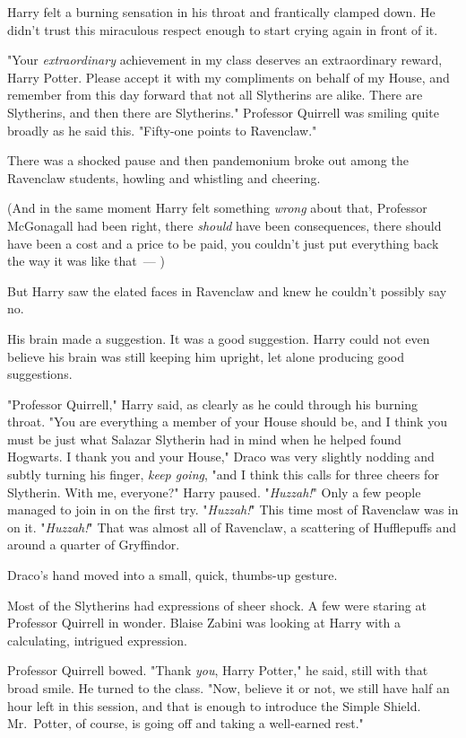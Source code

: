 Harry felt a burning sensation in his throat and frantically clamped down. He
didn't trust this miraculous respect enough to start crying again in front of
it.

"Your \emph{extraordinary} achievement in my class deserves an extraordinary
reward, Harry Potter. Please accept it with my compliments on behalf of my
House, and remember from this day forward that not all Slytherins are alike.
There are Slytherins, and then there are Slytherins." Professor Quirrell was
smiling quite broadly as he said this. "Fifty-one points to Ravenclaw."

There was a shocked pause and then pandemonium broke out among the Ravenclaw
students, howling and whistling and cheering.

(And in the same moment Harry felt something \emph{wrong} about that, Professor
McGonagall had been right, there \emph{should} have been consequences, there
should have been a cost and a price to be paid, you couldn't just put
everything back the way it was like that~--- )

But Harry saw the elated faces in Ravenclaw and knew he couldn't possibly say
no.

His brain made a suggestion. It was a good suggestion. Harry could not even
believe his brain was still keeping him upright, let alone producing good
suggestions.

"Professor Quirrell," Harry said, as clearly as he could through his burning
throat. "You are everything a member of your House should be, and I think you
must be just what Salazar Slytherin had in mind when he helped found Hogwarts.
I thank you and your House," Draco was very slightly nodding and subtly turning
his finger, \emph{keep going}, "and I think this calls for three cheers for
Slytherin. With me, everyone?" Harry paused. "\emph{Huzzah!}" Only a few people
managed to join in on the first try. "\emph{Huzzah!}" This time most of
Ravenclaw was in on it. "\emph{Huzzah!}" That was almost all of Ravenclaw, a
scattering of Hufflepuffs and around a quarter of Gryffindor.

Draco's hand moved into a small, quick, thumbs-up gesture.

Most of the Slytherins had expressions of sheer shock. A few were staring at
Professor Quirrell in wonder. Blaise Zabini was looking at Harry with a
calculating, intrigued expression.

Professor Quirrell bowed. "Thank \emph{you}, Harry Potter," he said, still with
that broad smile. He turned to the class. "Now, believe it or not, we still
have half an hour left in this session, and that is enough to introduce the
Simple Shield. Mr.~Potter, of course, is going off and taking a well-earned
rest."

